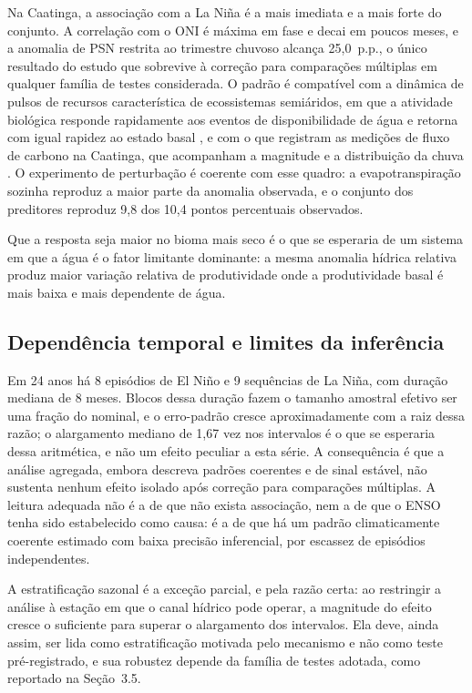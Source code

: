 \documentclass[a4paper,fleqn]{cas-sc}
\begin{document}
Na Caatinga, a associação com a La Niña é a mais imediata e a mais forte do conjunto. A correlação com o ONI é máxima em fase e decai em poucos meses, e a anomalia de PSN restrita ao trimestre chuvoso alcança 25,0~p.p., o único resultado do estudo que sobrevive à correção para comparações múltiplas em qualquer família de testes considerada. O padrão é compatível com a dinâmica de pulsos de recursos característica de ecossistemas semiáridos, em que a atividade biológica responde rapidamente aos eventos de disponibilidade de água e retorna com igual rapidez ao estado basal \citep{schwinning2004}, e com o que registram as medições de fluxo de carbono na Caatinga, que acompanham a magnitude e a distribuição da chuva \citep{mendes2020, mendes2025}. O experimento de perturbação é coerente com esse quadro: a evapotranspiração sozinha reproduz a maior parte da anomalia observada, e o conjunto dos preditores reproduz 9,8 dos 10,4 pontos percentuais observados.

Que a resposta seja maior no bioma mais seco é o que se esperaria de um sistema em que a água é o fator limitante dominante: a mesma anomalia hídrica relativa produz maior variação relativa de produtividade onde a produtividade basal é mais baixa e mais dependente de água.

\subsection{Dependência temporal e limites da inferência}

Em 24 anos há 8 episódios de El Niño e 9 sequências de La Niña, com duração mediana de 8 meses. Blocos dessa duração fazem o tamanho amostral efetivo ser uma fração do nominal, e o erro-padrão cresce aproximadamente com a raiz dessa razão; o alargamento mediano de 1,67 vez nos intervalos é o que se esperaria dessa aritmética, e não um efeito peculiar a esta série. A consequência é que a análise agregada, embora descreva padrões coerentes e de sinal estável, não sustenta nenhum efeito isolado após correção para comparações múltiplas. A leitura adequada não é a de que não exista associação, nem a de que o ENSO tenha sido estabelecido como causa: é a de que há um padrão climaticamente coerente estimado com baixa precisão inferencial, por escassez de episódios independentes.

A estratificação sazonal é a exceção parcial, e pela razão certa: ao restringir a análise à estação em que o canal hídrico pode operar, a magnitude do efeito cresce o suficiente para superar o alargamento dos intervalos. Ela deve, ainda assim, ser lida como estratificação motivada pelo mecanismo e não como teste pré-registrado, e sua robustez depende da família de testes adotada, como reportado na Seção~3.5.
\end{document}
